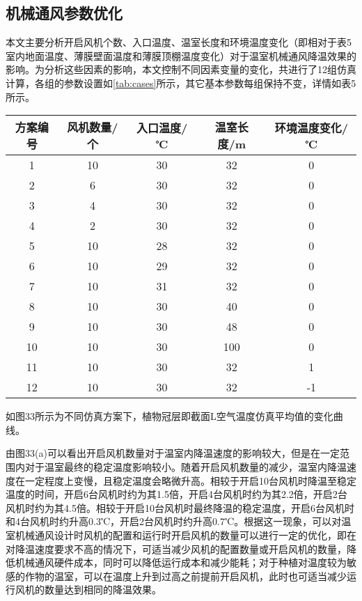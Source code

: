 	\subsection{机械通风参数优化}
	本文主要分析开启风机个数、入口温度、温室长度和环境温度变化（即相对于表5室内地面温度、薄膜壁面温度和薄膜顶棚温度变化）对于温室机械通风降温效果的影响。为分析这些因素的影响，本文控制不同因素变量的变化，共进行了12组仿真计算，各组的参数设置如\ref{tab:cases}所示，其它基本参数每组保持不变，详情如表5所示。
		\begin{table}[!hpb]
  			\centering
  			\begin{tabular}{ccccc} \toprule
			方案编号 & 风机数量/个 & 入口温度/℃ & 温室长度/m & 环境温度变化/℃\\ \midrule
			1 & 10	 & 30 & 32 & 0\\
			2 & 6 & 30 & 32 & 0\\
			3 & 4 & 30 & 32 & 0\\
			4 & 2 & 30 & 32 & 0\\
			5 & 10 & 28 & 32 & 0\\
			6 & 10 & 29 & 32 & 0\\
			7 & 10 & 31 & 32 & 0\\
			8 & 10 & 30 & 40 & 0\\
			9 & 10 & 30 & 48 & 0\\
			10 & 10 & 30 & 100 & 0\\
			11 & 10 & 30 & 32 & 1\\
			12 & 10 & 30 & 32 & -1\\ \bottomrule
 			\end{tabular}
		\end{table}
	如图33所示为不同仿真方案下，植物冠层即截面L空气温度仿真平均值的变化曲线。
	
由图33(a)可以看出开启风机数量对于温室内降温速度的影响较大，但是在一定范围内对于温室最终的稳定温度影响较小。随着开启风机数量的减少，温室内降温速度在一定程度上变慢，且稳定温度会略微升高。相较于开启10台风机时降温至稳定温度的时间，开启6台风机时约为其1.5倍，开启4台风机时约为其2.2倍，开启2台风机时约为其4.5倍。相较于开启10台风机时最终降温的稳定温度，开启6台风机时和4台风机时约升高0.3℃，开启2台风机时约升高0.7℃。根据这一现象，可以对温室机械通风设计时风机的配置和运行时开启风机的数量可以进行一定的优化，即在对降温速度要求不高的情况下，可适当减少风机的配置数量或开启风机的数量，降低机械通风硬件成本，同时可以降低运行成本和减少能耗；对于种植对温度较为敏感的作物的温室，可以在温度上升到过高之前提前开启风机，此时也可适当减少运行风机的数量达到相同的降温效果。

